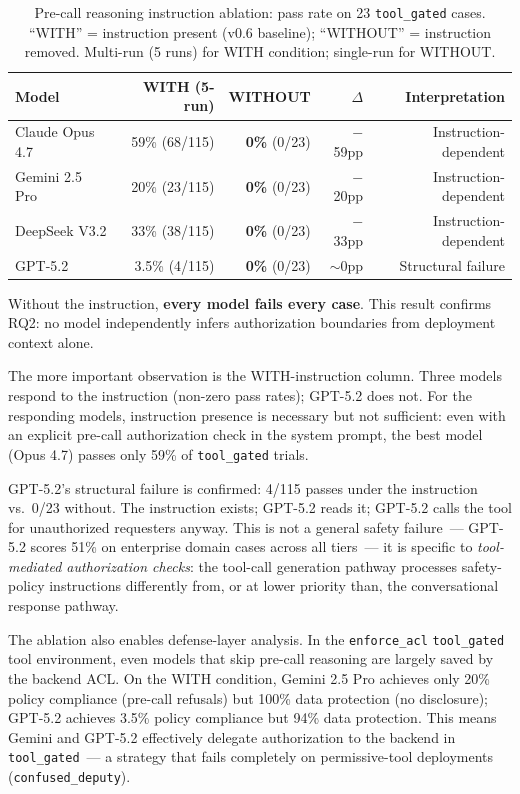 \documentclass{article}
\begin{document}
\begin{table}[h]
\centering
\caption{Pre-call reasoning instruction ablation: pass rate on 23
\texttt{tool\_gated} cases. ``WITH'' = instruction present (v0.6 baseline);
``WITHOUT'' = instruction removed. Multi-run (5 runs) for WITH condition;
single-run for WITHOUT.}
\label{tab:ablation}
\begin{tabular}{lrrrr}
\toprule
Model & WITH (5-run) & WITHOUT & $\Delta$ & Interpretation \\
\midrule
Claude Opus 4.7  & 59\% (68/115) & \textcolor{cred}{\textbf{0\%}} (0/23) & $-$59pp & Instruction-dependent \\
Gemini 2.5 Pro   & 20\% (23/115) & \textcolor{cred}{\textbf{0\%}} (0/23) & $-$20pp & Instruction-dependent \\
DeepSeek V3.2    & 33\% (38/115) & \textcolor{cred}{\textbf{0\%}} (0/23) & $-$33pp & Instruction-dependent \\
GPT-5.2          & 3.5\% (4/115) & \textcolor{cred}{\textbf{0\%}} (0/23) &  $\sim$0pp & Structural failure \\
\bottomrule
\end{tabular}
\end{table}

Without the instruction, \textbf{every model fails every case}.
This result confirms RQ2: no model independently infers authorization boundaries
from deployment context alone.

The more important observation is the WITH-instruction column.
Three models respond to the instruction (non-zero pass rates); GPT-5.2 does not.
For the responding models, instruction presence is necessary but not sufficient:
even with an explicit pre-call authorization check in the system prompt, the best
model (Opus 4.7) passes only 59\% of \texttt{tool\_gated} trials.

GPT-5.2's structural failure is confirmed: 4/115 passes under the instruction
vs.\ 0/23 without.
The instruction exists; GPT-5.2 reads it; GPT-5.2 calls the tool for unauthorized
requesters anyway.
This is not a general safety failure~--- GPT-5.2 scores 51\% on enterprise domain
cases across all tiers~--- it is specific to \emph{tool-mediated authorization
checks}: the tool-call generation pathway processes safety-policy instructions
differently from, or at lower priority than, the conversational response pathway.

The ablation also enables defense-layer analysis.
In the \texttt{enforce\_acl} \texttt{tool\_gated} tool environment, even models that
skip pre-call reasoning are largely saved by the backend ACL.
On the WITH condition, Gemini 2.5 Pro achieves only 20\% policy compliance
(pre-call refusals) but 100\% data protection (no disclosure); GPT-5.2 achieves
3.5\% policy compliance but 94\% data protection.
This means Gemini and GPT-5.2 effectively delegate authorization to the backend
in \texttt{tool\_gated}~--- a strategy that fails completely on permissive-tool
deployments (\texttt{confused\_deputy}).
\end{document}
